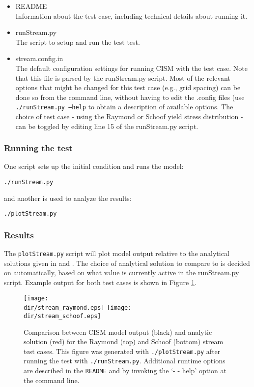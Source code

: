 \begin{itemize}
	\item README \\
		Information about the test case, including technical details about running it.
	\item runStream.py \\
		The script to setup and run the test test.
	\item stream.config.in \\
  The default configuration settings for running CISM with the test case. Note that this
  file is parsed by the runStream.py script. Most of the relevant options that might be changed
  for this test case (e.g., grid spacing) can be done so from the command line, without having to
  edit the .config files (use \texttt{./runStream.py --help} to obtain a description of available options.
  The choice of test case - using the Raymond or Schoof yield stress distribution -  can be toggled 
  by editing line 15 of the runStream.py script.
\end{itemize}

\subsubsection{Running the test}
One script sets up the initial condition and runs the model:

\texttt{./runStream.py}

and another is used to analyze the results:

\texttt{./plotStream.py}

\subsubsection{Results}
The \texttt{plotStream.py} script will plot model output relative to the analytical solutions
given in \citet{Raymond2000} and \citet{Schoof2006}. The choice of analytical solution to compare
to is decided on automatically, based on what value is currently active in the runStream.py script. 
Example output for both test cases is shown in Figure \ref{fig:stream-results}.
	
\begin{figure}[H!]
  \begin{center}
	\texttt{[image: \\dir/stream\_raymond.eps]}
	\texttt{[image: \\dir/stream\_schoof.eps]}
  \end{center}
  \caption{Comparison between CISM model output (black) and analytic solution (red) for the Raymond (top) and Schoof (bottom) stream test cases. This figure was generated with \texttt{./plotStream.py} after running the test with \texttt{./runStream.py}.
Additional runtime options are described in the \texttt{README} and by invoking the `- - help' option at the command line.}
  \label{fig:stream-results}
\end{figure} 

